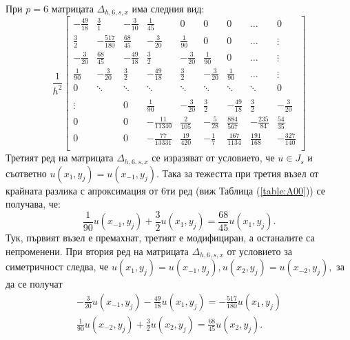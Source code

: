 \documentclass{article}
\newcommand{\rf}[1]{(\ref{#1})}
\begin{document}
При $p=6$ матрицата $\Delta_{h,6,s,x}$ има следния вид:
\[
\frac{1}{h^2}
\begin{bmatrix}
   -\frac{49}{18}		& \frac{3}{1}			&   -\frac{3}{10}		& \frac{1}{45}    		 &  0					& 0	   					&    0      	   	&   \dots           & 0    \\
    \frac{3}{2}    	&-\frac{517}{180}    	&    \frac{68}{45}     & -\frac{3}{20}  	 		& \frac{1}{90} 		&  0					 &   0      	   	&   \dots	       & \vdots  \\
    -\frac{3}{20}		& \frac{68}{45}         	& -\frac{49}{18} 	&  \frac{3}{2}		&  -\frac{3}{20}    	 &   \frac{1}{90}    	 &  0			&     \dots         &\vdots    \\
    \frac{1}{90}		& -\frac{3}{20}		& \frac{3}{2}         	& -\frac{49}{18} 	&  \frac{3}{2}		&  -\frac{3}{20}    	 &   \frac{1}{90} &     \dots         &\vdots    \\
        0           		& \ddots        		&         \ddots           	& \ddots        		&    \ddots   		&   \ddots      		 &     \ddots    	&  \ddots          &    0 \\	
\\
   \vdots      		&            		 	&    	0	      		& \frac{1}{90}		& -\frac{3}{20}		& \frac{3}{2}         	& -\frac{49}{18}	&  \frac{3}{2}  &  -\frac{3}{20} \\
    0      			&              	 	&    0      		&   -\frac{11}{11340}	 	&    \frac{2}{105} 	&  -\frac{5}{28} 	& \frac{884}{567} &-\frac{235}{84} &  \frac{54}{35}\\
    0              	& 	          		&    0              	&  -\frac{77}{13331}    		&  \frac{19}{420}&-\frac{1}{7}	 &  \frac{167}{1134} 	& \frac{191}{168}  &  -\frac{327}{140}\\
\end{bmatrix}
\]
Третият ред на матрицата $\Delta_{h,6,s,x}$ се изразяват от условието, че $u \in J_s$ и съответно $u(x_1, y_j) = u(x_{-1}, y_j)$. Така за тежестта при третия възел от крайната разлика с апроксимация от 6ти ред (виж Таблица \rf{table:A00}) се получава, че:
$$ \frac{1}{90}u(x_{-1}, y_j) + \frac{3}{2}u(x_1, y_j) = \frac{68}{45}u(x_1, y_j).$$ Тук, първият възел е премахнат, третият е модифициран, а останалите са непроменени. При втория ред на матрицата $\Delta_{h,6,s,x}$ от условието за симетричност следва, че
$u(x_1, y_j) = u(x_{-1}, y_j), u(x_2, y_j) = u(x_{-2}, y_j),$
за да се получат
\begin{align}
-\frac{3}{20}u(x_{-1}, y_j) -\frac{49}{18}u(x_1, y_j) = -\frac{517}{180}u(x_1, y_j) \nonumber\\
\frac{1}{90}u(x_{-2}, y_j) +\frac{3}{2}u(x_2, y_j) = \frac{68}{45}u(x_2, y_j). \nonumber
\end{align}
\end{document}
